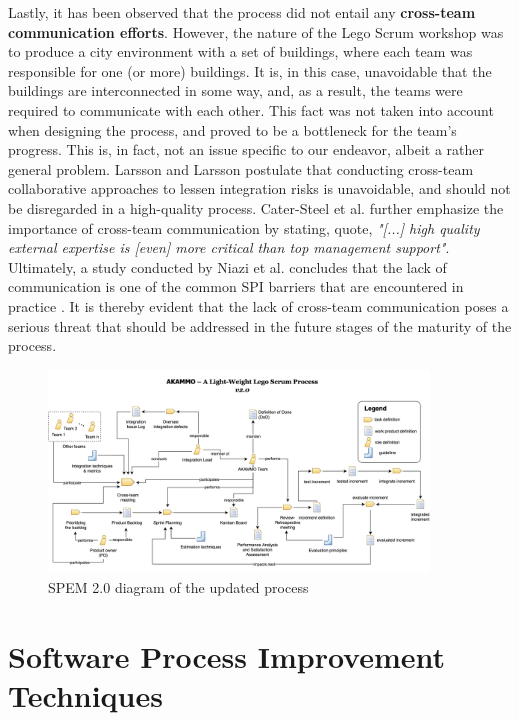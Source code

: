 \documentclass[conference]{IEEEtran}
\begin{document}
Lastly, it has been observed that the process did not entail any \textbf{cross-team
communication efforts}. However, the nature of the Lego Scrum workshop was to
produce a city environment with a set of buildings, where each team was
responsible for one (or more) buildings. It is, in this case, unavoidable that
the buildings are interconnected in some way, and, as a result, the teams were
required to communicate with each other. This fact was not taken
into account when designing the process, and proved to be a bottleneck for the
team's progress. This is, in fact, not an issue specific to our endeavor,
albeit a rather general problem. Larsson and Larsson \cite{Larsson2020}
postulate that conducting cross-team collaborative approaches to lessen
integration risks is unavoidable, and should not be disregarded in a
high-quality process. Cater-Steel et al. \cite{CaterSteel2006} further
emphasize the importance of cross-team communication by stating, quote,
\textit{"[...] high quality external expertise is [even] more critical than top
management support"}. Ultimately, a study conducted by Niazi et al. concludes
that the lack of communication is one of the common SPI barriers that are
encountered in practice \cite{Niazi2010}.
It is thereby evident that the lack of cross-team communication poses a serious
threat that should be addressed in the future stages of the maturity of the
process.

\begin{figure}
	\centering
	\includegraphics[width=0.9\textwidth]{process-diagram.png}
  \caption{SPEM 2.0 diagram of the updated process}
	\label{fig:process-diagram}
\end{figure}

\section{Software Process Improvement Techniques}
\label{sec:spi-techniques}
\end{document}
